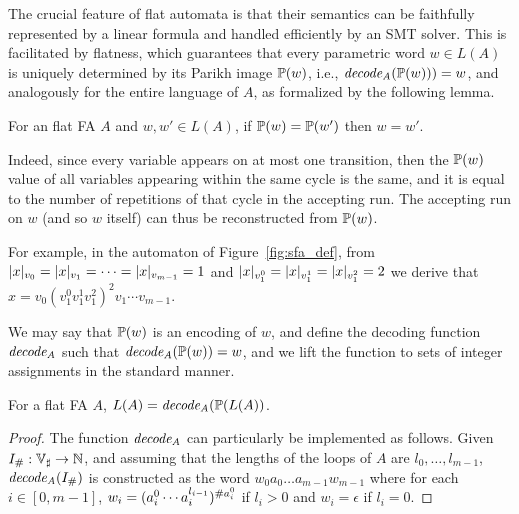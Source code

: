 \documentclass[sigplan,review,anonymous]{acmart}\settopmatter{printfolios=true,printccs=false,printacmref=false}
\begin{document}
The crucial feature of flat automata is that their semantics can be faithfully represented by a linear formula and handled efficiently by an SMT solver. 
%
This is facilitated by flatness, which guarantees that 
every parametric word $w\in L(A)$ is uniquely determined by its Parikh image $\mathbb{P}{(w)}$, i.e., $\mathit{decode_{A}} (\mathbb{P}{(w)})) = w$, and analogously for the entire language of $A$, as formalized by the following lemma. 

\begin{lemma}\label{lemma:parikh}
For an flat FA $A$ and $w,w'\in L(A)$, if $\mathbb{P}{(w)} = \mathbb{P}{(w')}$ then $w = w'$. 
\end{lemma}
%
Indeed, since every variable appears on at most one transition, then the $\mathbb{P}{(w)}$ value of all variables appearing within the same cycle is the same, and it is equal to the number of repetitions of that cycle in the accepting run. 
%
The accepting run on $w$ (and so $w$ itself) can thus be reconstructed from $\mathbb{P}{(w)}$. 

For example, in the automaton of Figure~\ref{fig:sfa_def}, 
from $|x|_{v_0} = |x|_{v_1} = \cdots = |x|_{v_{m-1}}=1$ and $|x|_{v^0_1}=|x|_{v^1_1}=|x|_{v^2_1}=2$ we derive that $x=v_0(v^0_1v^1_1v^2_1)^2v_1\cdots v_{m-1}$. 

We may say that $\mathbb{P}{(w)}$ is an encoding of $w$, and define the decoding function $\mathit{decode_{A}}$ such that $\mathit{decode_{A}}(\mathbb{P}{(w)}) = w$, and we lift the function to sets of integer assignments in the standard manner.
%


\begin{lemma}\label{lemma:decx}
For a flat FA $A$, $L(A) = \mathit{decode_{A}}(\mathbb{P}{(L(A))}$.
\end{lemma}
%
\begin{proof}
The function $\mathit{decode_{A}}$ can particularly be implemented as follows. Given $I_{\#}:\mbox{$\mathbb{V}_{\sharp}$}\rightarrow\mathbb{N}$,
and assuming that the lengths of the loops of $A$ are $l_0,\ldots,l_{m-1}$, 
$\mathit{decode_{A}}(I_{\#})$ is constructed as the word $w_0 a_{0} \ldots a_{m-1} w_{m-1}$ where for each $i\in [0,m-1]$,
$w_i = (a_i^0 \cdots a_i^{l_{i-1}})^{\#{a_i^0}}$ if $l_i >0$ and $w_i = \epsilon$ if $l_i = 0$. 
\end{proof}
\end{document}
